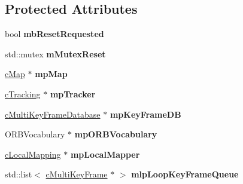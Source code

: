 \subsection*{Protected Attributes}
\begin{DoxyCompactItemize}
\item 
bool {\bfseries mb\+Reset\+Requested}\hypertarget{classMultiColSLAM_1_1cLoopClosing_aad4f84e9cc94275599abbb85b201cdcd}{}\label{classMultiColSLAM_1_1cLoopClosing_aad4f84e9cc94275599abbb85b201cdcd}

\item 
std\+::mutex {\bfseries m\+Mutex\+Reset}\hypertarget{classMultiColSLAM_1_1cLoopClosing_a7f6aa9827a2677131d49f0b12354fe08}{}\label{classMultiColSLAM_1_1cLoopClosing_a7f6aa9827a2677131d49f0b12354fe08}

\item 
\hyperlink{classMultiColSLAM_1_1cMap}{c\+Map} $\ast$ {\bfseries mp\+Map}\hypertarget{classMultiColSLAM_1_1cLoopClosing_a8b54ae9766f27efad122bff75ab49db9}{}\label{classMultiColSLAM_1_1cLoopClosing_a8b54ae9766f27efad122bff75ab49db9}

\item 
\hyperlink{classMultiColSLAM_1_1cTracking}{c\+Tracking} $\ast$ {\bfseries mp\+Tracker}\hypertarget{classMultiColSLAM_1_1cLoopClosing_adb7f8a2c7367ecc86fa51d9604a100be}{}\label{classMultiColSLAM_1_1cLoopClosing_adb7f8a2c7367ecc86fa51d9604a100be}

\item 
\hyperlink{classMultiColSLAM_1_1cMultiKeyFrameDatabase}{c\+Multi\+Key\+Frame\+Database} $\ast$ {\bfseries mp\+Key\+Frame\+DB}\hypertarget{classMultiColSLAM_1_1cLoopClosing_a48680fc015f9586c201361e598598079}{}\label{classMultiColSLAM_1_1cLoopClosing_a48680fc015f9586c201361e598598079}

\item 
O\+R\+B\+Vocabulary $\ast$ {\bfseries mp\+O\+R\+B\+Vocabulary}\hypertarget{classMultiColSLAM_1_1cLoopClosing_a2cd2bd997fa413d570e7f064a2a41561}{}\label{classMultiColSLAM_1_1cLoopClosing_a2cd2bd997fa413d570e7f064a2a41561}

\item 
\hyperlink{classMultiColSLAM_1_1cLocalMapping}{c\+Local\+Mapping} $\ast$ {\bfseries mp\+Local\+Mapper}\hypertarget{classMultiColSLAM_1_1cLoopClosing_a6c0115fd9b65cffb7b9cb3cd60c439e1}{}\label{classMultiColSLAM_1_1cLoopClosing_a6c0115fd9b65cffb7b9cb3cd60c439e1}

\item 
std\+::list$<$ \hyperlink{classMultiColSLAM_1_1cMultiKeyFrame}{c\+Multi\+Key\+Frame} $\ast$ $>$ {\bfseries mlp\+Loop\+Key\+Frame\+Queue}\hypertarget{classMultiColSLAM_1_1cLoopClosing_ae65d1e446bd2e5bdde7a7b559cc6b54f}{}\label{classMultiColSLAM_1_1cLoopClosing_ae65d1e446bd2e5bdde7a7b559cc6b54f}


\end{DoxyCompactItemize}
